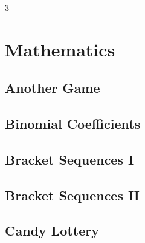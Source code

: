 \documentclass[8pt]{extarticle}
\begin{document}
\begin{multicols*}{3}

\section{Mathematics}

\subsection{Another Game}
\begin{caixaenunciado}

\end{caixaenunciado}
\vspace{0.3cm}


\subsection{Binomial Coefficients}
\begin{caixaenunciado}

\end{caixaenunciado}
\vspace{0.3cm}


\subsection{Bracket Sequences I}
\begin{caixaenunciado}

\end{caixaenunciado}
\vspace{0.3cm}


\subsection{Bracket Sequences II}
\begin{caixaenunciado}

\end{caixaenunciado}
\vspace{0.3cm}


\subsection{Candy Lottery}
\begin{caixaenunciado}

\end{caixaenunciado}
\vspace{0.3cm}



\end{multicols*}
\end{document}
